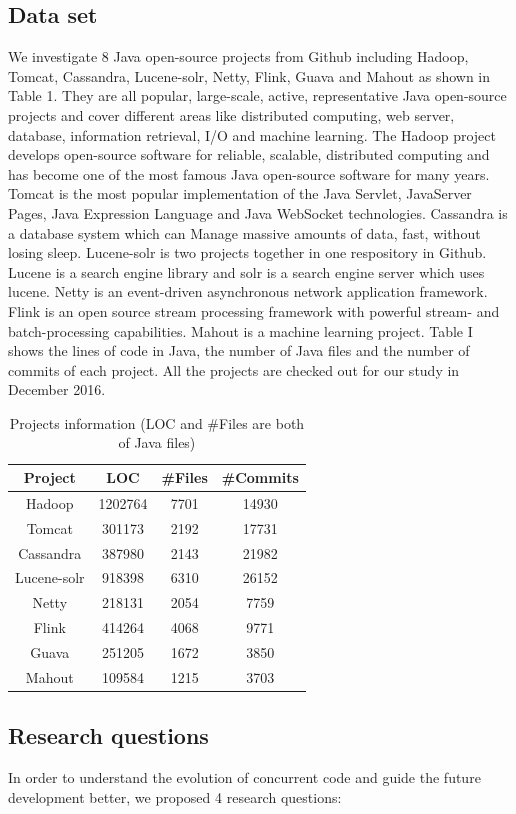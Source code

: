 \documentclass[conference]{IEEEtran}
\begin{document}
\subsection{Data set} We investigate 8 Java open-source projects from Github including Hadoop, Tomcat, Cassandra, Lucene-solr, Netty, Flink, Guava and Mahout as shown in Table 1. They are all popular, large-scale, active, representative Java open-source projects and cover different areas like distributed computing, web server, database, information retrieval, I/O and machine learning. The Hadoop project develops open-source software for reliable, scalable, distributed computing and has become one of the most famous Java open-source software for many years. Tomcat is the most popular implementation of the Java Servlet, JavaServer Pages, Java Expression Language and Java WebSocket technologies. Cassandra is a database system which can Manage massive amounts of data, fast, without losing sleep. Lucene-solr is two projects together in one respository in Github. Lucene is a search engine library and solr is a search engine server which uses lucene. Netty is an event-driven asynchronous network application framework. Flink is an open source stream processing framework with powerful stream- and batch-processing capabilities. Mahout is a machine learning project. Table I shows the lines of code in Java, the number of Java files and the number of commits of each project. All the projects are checked out for our study in December 2016.

\begin{table}
	\centering
	\caption{Projects information (LOC and \#Files are both of Java files)}
	\begin{tabular}{|c|c|c|c|}\hline
		Project&LOC&\#Files&\#Commits\\\hline
		Hadoop&1202764&7701&14930\\\hline
		Tomcat&301173&2192&17731\\\hline
		Cassandra&387980&2143&21982\\\hline
		Lucene-solr&918398&6310&26152\\\hline
		Netty&218131&2054&7759\\\hline
		Flink&414264&4068&9771\\\hline
		Guava&251205&1672&3850\\\hline
		Mahout&109584&1215&3703\\\hline
	\end{tabular}
\end{table}

\subsection{Research questions}
In order to understand the evolution of concurrent code and guide the future development better, we proposed 4 research questions:
\end{document}
